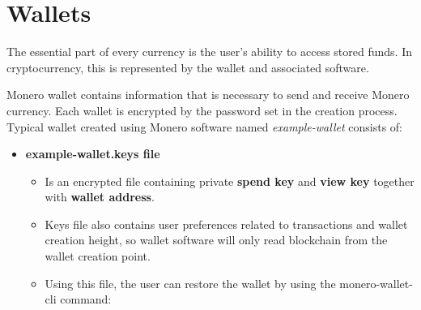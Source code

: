 \documentclass[
  printed, %
  table,   %
  lof,     %
  lot,     %
           oneside, color
]{fithesis3}
\begin{document}
\section{Wallets}
\label{sec:wallets}
The essential part of every currency is the user's ability to access stored funds. In cryptocurrency, this is represented by the wallet and associated software.

Monero wallet contains information that is necessary to send and receive Monero currency. Each wallet is encrypted by the password set in the creation process. Typical wallet created using Monero software named \textit{example-wallet} consists of:
\begin{itemize}\itemsep0em
\item \textbf{example-wallet.keys file}
\begin{itemize}\itemsep0em
\item Is an encrypted file containing private \textbf{spend key} and \textbf{view key} together with \textbf{wallet address}.
\item Keys file also contains user preferences related to transactions and wallet creation height, so wallet software will only read blockchain from the wallet creation point.
\item Using this file, the user can restore the wallet by using the monero-wallet-cli command:


\end{itemize}
\end{itemize}
\end{document}
